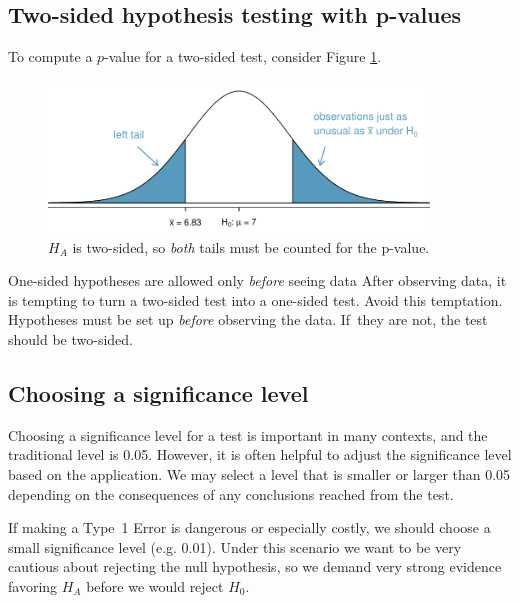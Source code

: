 \subsection{Two-sided hypothesis testing with p-values}
\label{twoSidedTestsWithPValues}


To compute a $p$-value for a two-sided test, consider Figure \ref{2ndSchSleepHTExample}.
\begin{figure}
   \centering
   \includegraphics[width=0.9\textwidth]{ch_inference_foundations/figures/2ndSchSleepHTExample/2ndSchSleepHTExample}
   \caption{$H_A$ is two-sided, so \emph{both} tails must be counted for the p-value.}
   \label{2ndSchSleepHTExample}
\end{figure}



\begin{caution}{One-sided hypotheses are allowed only \emph{before} seeing data}
{After observing data, it is tempting to turn a two-sided test into a one-sided test. Avoid this temptation. Hypotheses must be set up \emph{before} observing the data. If~they are not, the test should be two-sided.}
\end{caution}


\subsection{Choosing a significance level}
\label{significanceLevel}


Choosing a significance level for a test is important in many contexts, and the traditional level is 0.05. However, it is often helpful to adjust the significance level based on the application. We may select a level that is smaller or larger than 0.05 depending on the consequences of any conclusions reached from the test.

If making a Type~1 Error is dangerous or especially costly, we should choose a small significance level (e.g. 0.01). Under this scenario we want to be very cautious about rejecting the null hypothesis, so we demand very strong evidence favoring $H_A$ before we would reject $H_0$.

